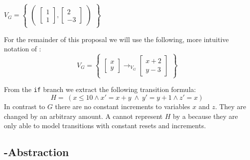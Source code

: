 $V_G = 
\begin{Bmatrix}
	\begin{pmatrix}
		\begin{bmatrix}
			1 \\
			1
		\end{bmatrix},
		\begin{bmatrix}
			2 \\
			-3
		\end{bmatrix}
	\end{pmatrix}
\end{Bmatrix}
$ \par \vspace{2pt}
For the remainder of this proposal we will use the following, more intuitive notation of \qvasr:
\begin{equation*}
	V_G = 
	\begin{Bmatrix}
		\begin{bmatrix}
			x \\
			y
		\end{bmatrix} \rightarrow_{V_G}
		\begin{bmatrix}
			x + 2 \\
			y - 3
		\end{bmatrix}
	\end{Bmatrix}
\end{equation*}

From the \texttt{if} branch we extract the following transition formula:
\begin{equation*}
	H= \ (x \leq 10 \land x' = x + y\ \land\ y' = y + 1 \land z' = x)
\end{equation*} In contrast to $G$ there are no constant increments to variables $x$ and $z$. They are changed by an arbitrary amount. A \qvasr cannot represent $H$ by a  \qvasr because they are only able to model transitions with constant resets and increments. 

\subsection{\qvasr-Abstraction}

